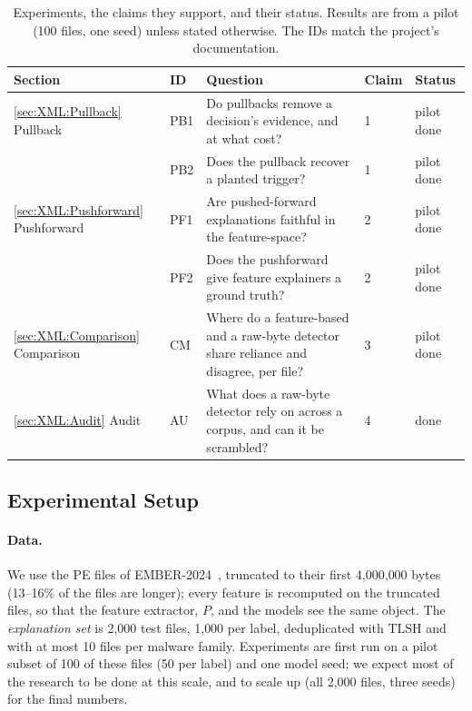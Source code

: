 \begin{table}[t]
  \centering
  \footnotesize
  \begin{tabular}{lllll}
    \toprule
    Section & ID & Question & Claim & Status \\
    \midrule
    \ref{sec:XML:Pullback} Pullback & PB1 & Do pullbacks remove a decision's evidence, and at what cost? & 1 & pilot done \\
     & PB2 & Does the pullback recover a planted trigger? & 1 & pilot done \\
    \ref{sec:XML:Pushforward} Pushforward & PF1 & Are pushed-forward explanations faithful in the feature-space? & 2 & pilot done \\
     & PF2 & Does the pushforward give feature explainers a ground truth? & 2 & pilot done \\
    \ref{sec:XML:Comparison} Comparison & CM & Where do a feature-based and a raw-byte detector share reliance and disagree, per file? & 3 & pilot done \\
    \ref{sec:XML:Audit} Audit & AU & What does a raw-byte detector rely on across a corpus, and can it be scrambled? & 4 & done \\
    \bottomrule
  \end{tabular}
  \caption{Experiments, the claims they support, and their status. Results are from a pilot (100 files, one seed) unless stated otherwise. The IDs match the project's documentation.}
  \label{tab:XML:Experiments}
\end{table}

\subsection{Experimental Setup}
\label{sec:XML:Setup}

\paragraph{Data.} We use the PE files of EMBER-2024~\cite{joyce2025ember}, truncated to their first 4{,}000{,}000 bytes (13--16\% of the files are longer); every feature is recomputed on the truncated files, so that the feature extractor, $P$, and the models see the same object. The \textit{explanation set} is 2{,}000 test files, 1{,}000 per label, deduplicated with TLSH and with at most 10 files per malware family. Experiments are first run on a pilot subset of 100 of these files (50 per label) and one model seed; we expect most of the research to be done at this scale, and to scale up (all 2{,}000 files, three seeds) for the final numbers.

